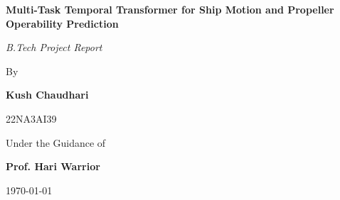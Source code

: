 \documentclass[12pt,a4paper]{report}
\begin{document}
\begin{titlepage}
    \centering
    \vspace*{2cm}
    
    {\Huge \textbf{Multi-Task Temporal Transformer for Ship Motion and Propeller Operability Prediction} \par}
    
    \vspace{2cm}
    {\Large \textit{B.Tech Project Report} \par}
    
    \vspace{1.5cm}
    {\normalsize By \par}
    \vspace{0.5cm}
    {\Large \textbf{Kush Chaudhari} \par}
    {\large 22NA3AI39 \par}
    
    \vspace{2cm}
    {\normalsize Under the Guidance of \par}
    \vspace{0.5cm}
    {\Large \textbf{Prof. Hari Warrior} \par}
    
    \vfill
    
    {\large \today \par}
\end{titlepage}

\begin{abstract}
Predicting the seakeeping behavior of a vessel is crucial for ensuring operational safety, passenger comfort, and structural integrity. Recently, deep learning surrogate models have emerged as computationally efficient alternatives to traditional hydrodynamic solvers. In the previous phase of this project, a Transformer-based model was successfully developed to predict the 6-Degrees of Freedom (6-DoF) ship motions from simulated time-series data. In this phase, the simulation environment was augmented by introducing a propeller disc representation at the stern of the vessel. This report details the development of a Multi-Task Temporal Transformer designed not only to forecast the 6-DoF motions but also to simultaneously predict propeller operability. Specifically, the model continuously estimates a Propeller Emergence Score and classifies binary emergence events to prevent ventilation and efficiency losses. By evaluating the model under different emergence thresholds, we demonstrate near-perfect motion regression ($R^2 > 0.999$) and highly accurate emergence classification (F1-Score $> 0.99$), proving the viability of multi-task Transformers in complex maritime forecasting applications.
\end{abstract}
\end{document}
